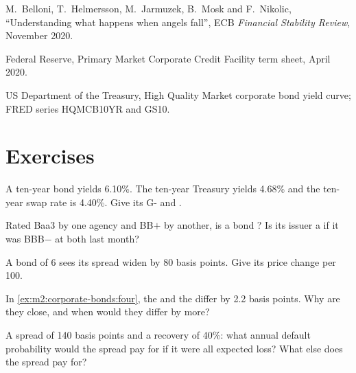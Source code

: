 \begin{omsources}
\item M.~Belloni, T.~Helmersson, M.~Jarmuzek, B.~Mosk and F.~Nikolic,
``Understanding what happens when angels fall'', ECB \emph{Financial Stability Review},
November 2020.
\item Federal Reserve, Primary Market Corporate Credit Facility term sheet, April 2020.
\item US Department of the Treasury, High Quality Market corporate bond yield curve;
FRED series HQMCB10YR and GS10.
\end{omsources}

\section{Exercises}

\begin{exercise}[$\star$]\label{exo:m2:corporate-bonds:1}
A ten-year bond yields 6.10\%. The ten-year Treasury yields 4.68\% and the ten-year
swap rate is 4.40\%. Give its G- and .
\end{exercise}

\begin{exercise}[$\star$]\label{exo:m2:corporate-bonds:2}
Rated Baa3 by one agency and BB$+$ by another, is a bond ?
Is its issuer a  if it was BBB$-$ at both last month?
\end{exercise}

\begin{exercise}[$\star$]\label{exo:m2:corporate-bonds:3}
A bond of  6 sees its spread widen by 80 basis points. Give its
price change per 100.
\end{exercise}

\begin{exercise}[$\star\star$]\label{exo:m2:corporate-bonds:4}
In \cref{ex:m2:corporate-bonds:four}, the  and the  differ
by 2.2 basis points. Why are they close, and when would they differ by more?
\end{exercise}

\begin{exercise}[$\star\star$]\label{exo:m2:corporate-bonds:5}
A spread of 140 basis points and a recovery of 40\%: what annual default probability
would the spread pay for if it were all expected loss? What else does the spread pay
for?
\end{exercise}

